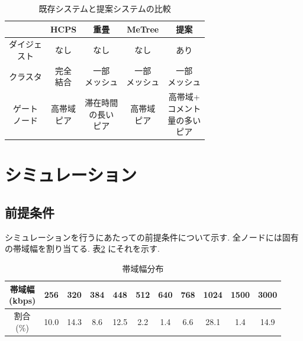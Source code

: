 \documentclass[letter]{ieicej}
\begin{document}
\begin{table}[h]

  \centering

  \vspace*{0.3cm}
  \caption{既存システムと提案システムの比較 \label{tb:tb1}}
  \begin{tabular}{|c|c|c|c|c|} \hline
    & HCPS & 重畳 & MeTree & 提案 \\ \hline
    \shortstack{ダイジェ \\ スト} & なし & なし & なし & あり\\ \hline
    クラスタ & \shortstack{完全 \\ 結合} & \shortstack{一部 \\ メッシュ} & \shortstack{一部 \\ メッシュ}  & \shortstack{一部 \\ メッシュ}\\
    \hline
    \shortstack{ゲート \\ ノード} & \shortstack{高帯域 \\ ピア} & \shortstack{滞在時間 \\ の長い \\ ピア} & \shortstack{高帯域 \\ ピア} & \shortstack{高帯域+ \\ コメント \\ 量の多い \\ ピア} \\
    \hline
  \end{tabular}
\end{table}

\section{シミュレーション}
\subsection{前提条件}
シミュレーションを行うにあたっての前提条件について示す. 全ノードには固有の帯域幅を割り当てる. 表\ref{tb:tb2} にそれを示す.

\begin{table}[h]

  \centering

  \vspace*{0.3cm}
  \caption{帯域幅分布 \label{tb:tb2}}
  \begin{tabular}{|c|c|c|c|c|c|c|c|c|c|c|} \hline
    \shortstack{帯域幅 \\ (kbps)} & 256 & 320 & 384 & 448 & 512 & 640 & 768 & 1024 & 1500 & 3000 \\ \hline
    \shortstack{割合 \\ (\%)} & 10.0 & 14.3 & 8.6 & 12.5 & 2.2 & 1.4 & 6.6 & 28.1 & 1.4 & 14.9 \\ \hline
  \end{tabular}
\end{table}
\end{document}
